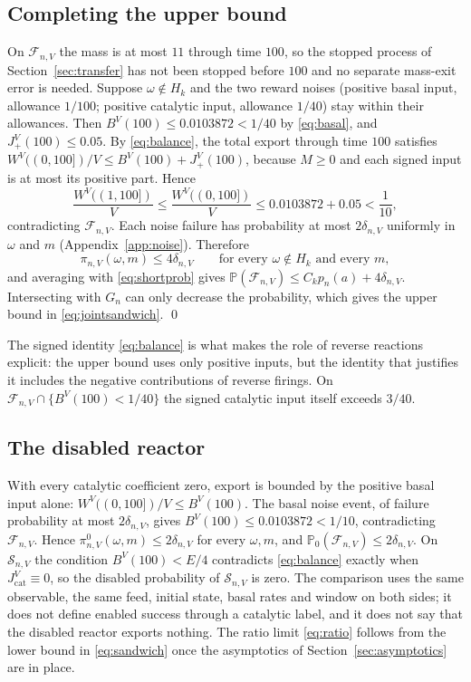 \documentclass[11pt,letterpaper]{article}
\theoremstyle{plain}
\theoremstyle{definition}
\theoremstyle{remark}
\numberwithin{equation}{section}
\newcommand{\PP}{\mathbb P}
\newcommand{\cF}{\mathcal F}
\newcommand{\cS}{\mathcal S}
\newcommand{\cat}{\mathrm{cat}}
\begin{document}
\subsection{Completing the upper bound}
On $\cF_{n,V}$ the mass is at most $11$ through time $100$, so the stopped process of Section~\ref{sec:transfer} has not been stopped before $100$ and no separate mass-exit error is needed. Suppose $\omega\notin H_k$ and the two reward noises (positive basal input, allowance $1/100$; positive catalytic input, allowance $1/40$) stay within their allowances. Then $B^V(100)\le0.0103872<1/40$ by \eqref{eq:basal}, and $J^V_+(100)\le0.05$. By \eqref{eq:balance}, the total export through time $100$ satisfies $W^V((0,100])/V\le B^V(100)+J^V_+(100)$, because $M\ge0$ and each signed input is at most its positive part. Hence
\[
 \frac{W^V((1,100])}V\le\frac{W^V((0,100])}V\le0.0103872+0.05<\frac1{10},
\]
contradicting $\cF_{n,V}$. Each noise failure has probability at most $2\delta_{n,V}$ uniformly in $\omega$ and $m$ (Appendix~\ref{app:noise}). Therefore
\begin{equation}\label{eq:pointwiseupper}
 \pi_{n,V}(\omega,m)\le4\delta_{n,V}\qquad\text{for every }\omega\notin H_k\text{ and every }m ,
\end{equation}
and averaging with \eqref{eq:shortprob} gives $\PP(\cF_{n,V})\le C_kp_n(a)+4\delta_{n,V}$. Intersecting with $G_n$ can only decrease the probability, which gives the upper bound in \eqref{eq:jointsandwich}. \qed

The signed identity \eqref{eq:balance} is what makes the role of reverse reactions explicit: the upper bound uses only positive inputs, but the identity that justifies it includes the negative contributions of reverse firings. On $\cF_{n,V}\cap\{B^V(100)<1/40\}$ the signed catalytic input itself exceeds $3/40$.

\subsection{The disabled reactor}
With every catalytic coefficient zero, export is bounded by the positive basal input alone: $W^V((0,100])/V\le B^V(100)$. The basal noise event, of failure probability at most $2\delta_{n,V}$, gives $B^V(100)\le0.0103872<1/10$, contradicting $\cF_{n,V}$. Hence $\pi^0_{n,V}(\omega,m)\le2\delta_{n,V}$ for every $\omega,m$, and $\PP_0(\cF_{n,V})\le2\delta_{n,V}$. On $\cS_{n,V}$ the condition $B^V(100)<E/4$ contradicts \eqref{eq:balance} exactly when $J^V_\cat\equiv0$, so the disabled probability of $\cS_{n,V}$ is zero. The comparison uses the same observable, the same feed, initial state, basal rates and window on both sides; it does not define enabled success through a catalytic label, and it does not say that the disabled reactor exports nothing. The ratio limit \eqref{eq:ratio} follows from the lower bound in \eqref{eq:sandwich} once the asymptotics of Section~\ref{sec:asymptotics} are in place.
\end{document}
